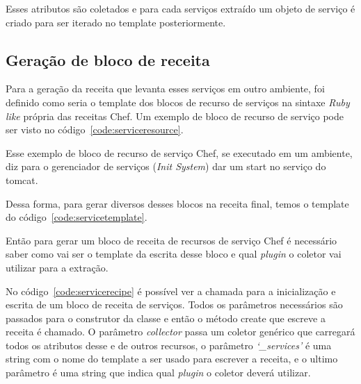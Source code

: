 Esses atributos são coletados e para cada serviços extraído um objeto de serviço
é criado para ser iterado no template posteriormente.

\subsection{Geração de bloco de receita}
Para a geração da receita que levanta esses serviços em outro ambiente, foi 
definido como seria o template dos blocos de recurso de serviços na sintaxe 
\textit{Ruby like} própria das receitas Chef. Um exemplo de bloco de recurso de serviço pode ser visto no código~\ref{code:serviceresource}.

\noindent\begin{minipage}{\textwidth}
  \lstset{style=shell}
  
\end{minipage}\hfill

Esse exemplo de bloco de recurso de serviço Chef, se executado em um ambiente, diz para o
gerenciador de serviços (\textit{Init System}) dar um start no serviço do tomcat.

Dessa forma, para gerar diversos desses blocos na receita final, temos o template
do código~\ref{code:servicetemplate}.

\noindent\begin{minipage}{\textwidth}
  \lstset{style=shell}
  
\end{minipage}\hfill

Então para gerar um bloco de receita de recursos de serviço Chef é necessário
saber como vai ser o template da escrita desse bloco e qual \textit{plugin} o
coletor vai utilizar para a extração.

No código~\ref{code:servicerecipe} é possível ver a chamada para a inicialização e escrita de um
bloco de receita de serviços. Todos os parâmetros necessários são passados para
o construtor da classe e então o método create que escreve a receita é chamado.
O parâmetro \textit{collector} passa um coletor genérico que carregará todos os
atributos desse e de outros recursos, o parâmetro \textit{`\_services'} é uma
string com o nome do template a ser usado para escrever a receita, e o ultimo
parâmetro é uma string que indica qual \textit{plugin} o coletor deverá utilizar.

